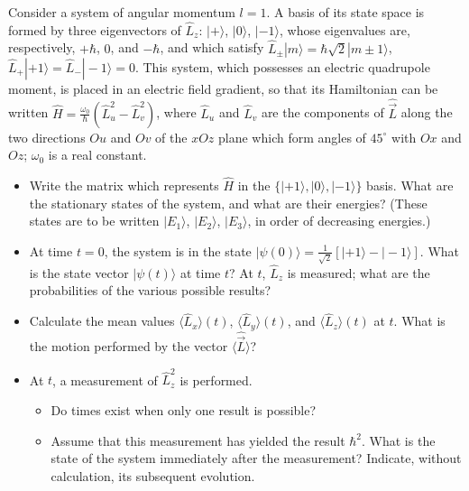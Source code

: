 \documentclass[12pt,a4paper]{article}
\newenvironment{problem}[2][Problem]{\begin{trivlist}
\item[\hskip \labelsep {\bfseries #1}\hskip \labelsep {\bfseries #2.}]}{\end{trivlist}}
\begin{document}
\begin{problem}{5}
[C-T Exercise 6-6] Consider a system of angular momentum $l=1$. A basis of its  state space is formed by three eigenvectors of $\hat{L}_z$: $|+\rangle$, $|0\rangle$, $|-1\rangle$, whose eigenvalues are, respectively, $+\hbar$, $0$, and $-\hbar$, and which satisfy $\hat{L}_{\pm}|m\rangle=\hbar\sqrt{2}|m\pm1\rangle$, $\hat{L}_+|+1\rangle=\hat{L}_-|-1\rangle=0$. This system, which possesses an electric quadrupole moment, is placed in an electric field gradient, so that its Hamiltonian can be written $\hat{H}=\frac{\omega_0}{\hbar}(\hat{L}_u^2-\hat{L}_v^2)$, where $\hat{L}_u$ and $\hat{L}_v$ are the components of $\hat{\vec{L}}$ along the two directions $Ou$ and $Ov$ of the $xOz$ plane which form angles of $45^{\circ}$ with $Ox$ and $Oz$; $\omega_0$ is a real constant.
\begin{itemize}
\item[(a)] Write the matrix which represents $\hat{H}$ in the $\{|+1\rangle,|0\rangle,|-1\rangle\}$ basis. What are the stationary states of the system, and what are their energies? (These states are to be written $|E_1\rangle$, $|E_2\rangle$, $|E_3\rangle$, in order of decreasing energies.)
\item[(b)] At time $t=0$, the system is in the state $|\psi(0)\rangle=\frac{1}{\sqrt{2}}[|+1\rangle-|-1\rangle]$. What is the state vector $|\psi(t)\rangle$ at time $t$? At $t$, $\hat{L}_z$ is measured; what are the probabilities of the various possible results?
\item[(c)] Calculate the mean values $\langle\hat{L}_x\rangle(t)$, $\langle\hat{L}_y\rangle(t)$, and $\langle\hat{L}_z\rangle(t)$ at $t$. What is the motion performed by the vector $\langle\hat{\vec{L}}\rangle$?
\item[(d)] At $t$, a measurement of $\hat{L}_z^2$ is performed.
\begin{itemize}
\item[i.] Do times exist when only one result is possible?
\item[ii.] Assume that this measurement has yielded the result $\hbar^2$. What is the state of the system immediately after the measurement? Indicate, without calculation, its subsequent evolution.
\end{itemize}
\end{itemize}
\end{problem}
\end{document}
